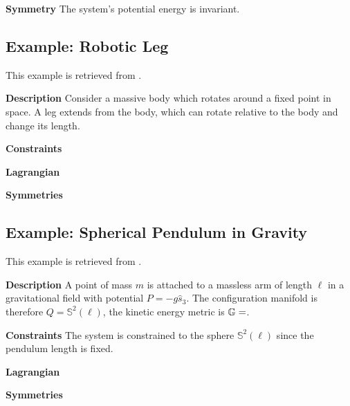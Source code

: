 \documentclass[main.tex]{subfiles}
\begin{document}
\textbf{Symmetry} The system's potential energy is invariant.

\subsection{Example: Robotic Leg} 
This example is retrieved from \cite[293]{bullo2019geometric}.%

\textbf{Description} Consider a massive body which rotates around a fixed point in space. A leg extends from the body, which can rotate relative to the body and change its length.

\textbf{Constraints}

\textbf{Lagrangian}

\textbf{Symmetries}

\subsection{Example: Spherical Pendulum in Gravity}
This example is retrieved from \cite[295]{bullo2019geometric}.%

\textbf{Description} A point of mass $m$ is attached to a massless arm of length $\ell$ in a gravitational field with potential $P=-g\hat{s}_3$. The configuration manifold is therefore $Q=\mathbb{S}^2(\ell)$, the kinetic energy metric is $\mathbb{G}=$.

\textbf{Constraints} The system is constrained to the sphere $\mathbb{S}^2(\ell)$ since the pendulum length is fixed.

\textbf{Lagrangian}

\textbf{Symmetries}
\end{document}
